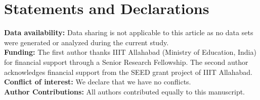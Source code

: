 \documentclass[12pt,oneside,reqno]{amsart}
\theoremstyle{definition}
\theoremstyle{remark}
\begin{document}
\section*{Statements and Declarations}
\textbf{Data availability:} Data sharing is not applicable to this article as no data sets were generated or analyzed during the current study.\\
  \textbf{Funding:} The first author thanks IIIT Allahabad (Ministry of Education, India) for financial support through a Senior Research Fellowship. The second author acknowledges financial support from the SEED grant project of IIIT Allahabad.\\
 \textbf{Conflict of interest:} %
We declare that we have no conflicts.\\
 \textbf{Author Contributions:} %
 All authors contributed equally to this manuscript.
 
\end{document}
